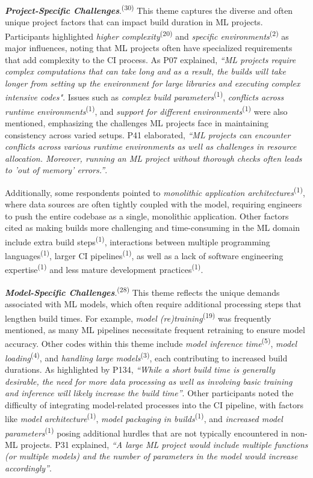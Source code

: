 \textit{\textbf{Project-Specific Challenges}}.\textsuperscript{(30)} This theme captures the diverse and often unique project factors that can impact build duration in ML projects. Participants highlighted \textit{higher complexity}\textsuperscript{(20)} and \textit{specific environments}\textsuperscript{(2)} as major influences, noting that ML projects often have specialized requirements that add complexity to the CI process. As P07 explained, \textit{``ML projects require complex computations that can take long and as a result, the builds will take longer from setting up the environment for large libraries and executing complex intensive codes"}.
Issues such as \textit{complex build parameters}\textsuperscript{(1)}, \textit{conflicts across runtime environments}\textsuperscript{(1)}, and \textit{support for different environments}\textsuperscript{(1)} were also mentioned, emphasizing the challenges ML projects face in maintaining consistency across varied setups. 
P41 elaborated, \textit{``ML projects can encounter conflicts across various runtime environments as well as challenges in resource allocation. Moreover, running an ML project without thorough checks often leads to 'out of memory' errors.''}.

Additionally, some respondents pointed to \textit{monolithic application architectures}\textsuperscript{(1)}, where data sources are often tightly coupled with the model, requiring engineers to push the entire codebase as a single, monolithic application. 
Other factors cited as making builds more challenging and time-consuming in the ML domain include extra build steps\textsuperscript{(1)}, interactions between multiple programming languages\textsuperscript{(1)}, larger CI pipelines\textsuperscript{(1)}, as well as a lack of software engineering expertise\textsuperscript{(1)} and less mature development practices\textsuperscript{(1)}.

\textit{\textbf{Model-Specific Challenges}}.\textsuperscript{(28)} This theme reflects the unique demands associated with ML models, which often require additional processing steps that lengthen build times. For example, \textit{model (re)training}\textsuperscript{(19)} was frequently mentioned, as many ML pipelines necessitate frequent retraining to ensure model accuracy. Other codes within this theme include \textit{model inference time}\textsuperscript{(5)}, \textit{model loading}\textsuperscript{(4)}, and \textit{handling large models}\textsuperscript{(3)}, each contributing to increased build durations. As highlighted by P134, \textit{``While a short build time is generally desirable, the need for more data processing as well as involving basic training and inference will likely increase the build time''}.
Other participants noted the difficulty of integrating model-related processes into the CI pipeline, with factors like \textit{model architecture}\textsuperscript{(1)}, \textit{model packaging in builds}\textsuperscript{(1)}, and \textit{increased model parameters}\textsuperscript{(1)} posing additional hurdles that are not typically encountered in non-ML projects.
P31 explained, \textit{``A large ML project would include multiple functions (or multiple models) and the number of parameters in the model would increase accordingly''}.

